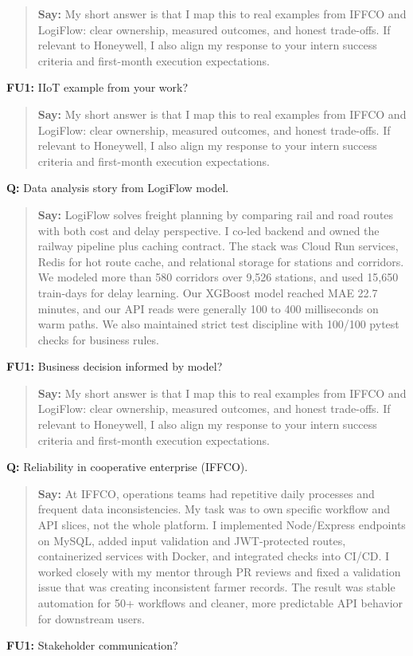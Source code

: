 \documentclass[9pt,a4paper]{article}
\begin{document}
\begin{quote}\small\textbf{Say:} My short answer is that I map this to real examples from IFFCO and LogiFlow: clear ownership, measured outcomes, and honest trade-offs. If relevant to Honeywell, I also align my response to your intern success criteria and first-month execution expectations.\end{quote}
\vspace{2mm}
\textbf{FU1:} IIoT example from your work?

\begin{quote}\small\textbf{Say:} My short answer is that I map this to real examples from IFFCO and LogiFlow: clear ownership, measured outcomes, and honest trade-offs. If relevant to Honeywell, I also align my response to your intern success criteria and first-month execution expectations.\end{quote}
\vspace{2mm}
\textbf{Q:} Data analysis story from LogiFlow model.

\begin{quote}\small\textbf{Say:} LogiFlow solves freight planning by comparing rail and road routes with both cost and delay perspective. I co-led backend and owned the railway pipeline plus caching contract. The stack was Cloud Run services, Redis for hot route cache, and relational storage for stations and corridors. We modeled more than 580 corridors over 9,526 stations, and used 15,650 train-days for delay learning. Our XGBoost model reached MAE 22.7 minutes, and our API reads were generally 100 to 400 milliseconds on warm paths. We also maintained strict test discipline with 100/100 pytest checks for business rules.\end{quote}
\vspace{2mm}
\textbf{FU1:} Business decision informed by model?

\begin{quote}\small\textbf{Say:} My short answer is that I map this to real examples from IFFCO and LogiFlow: clear ownership, measured outcomes, and honest trade-offs. If relevant to Honeywell, I also align my response to your intern success criteria and first-month execution expectations.\end{quote}
\vspace{2mm}
\textbf{Q:} Reliability in cooperative enterprise (IFFCO).

\begin{quote}\small\textbf{Say:} At IFFCO, operations teams had repetitive daily processes and frequent data inconsistencies. My task was to own specific workflow and API slices, not the whole platform. I implemented Node/Express endpoints on MySQL, added input validation and JWT-protected routes, containerized services with Docker, and integrated checks into CI/CD. I worked closely with my mentor through PR reviews and fixed a validation issue that was creating inconsistent farmer records. The result was stable automation for 50+ workflows and cleaner, more predictable API behavior for downstream users.\end{quote}
\vspace{2mm}
\textbf{FU1:} Stakeholder communication?
\end{document}
